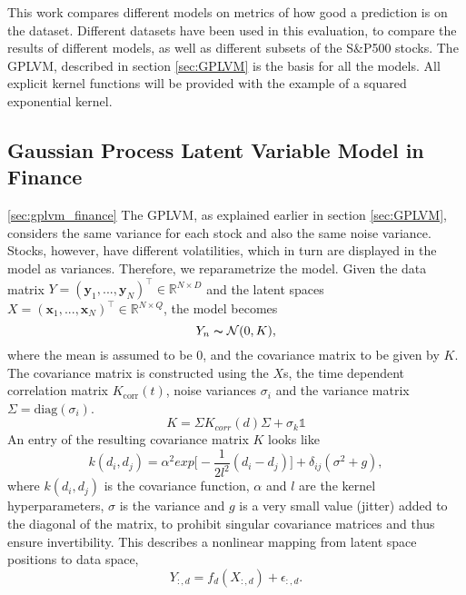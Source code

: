 This work compares different models on metrics of how good a prediction is on the dataset. Different datasets have been used in this evaluation, to compare the results of different models, as well as different subsets of the S\&P500 stocks. The GPLVM, described in section \ref{sec:GPLVM} is the basis for all the models. All explicit kernel functions will be provided with the example of a squared exponential kernel.

\subsection{Gaussian Process Latent Variable Model in Finance}
\ref{sec:gplvm_finance}
The GPLVM, as explained earlier in section \ref{sec:GPLVM}, considers the same variance for each stock and also the same noise variance. Stocks, however, have different volatilities, which in turn are displayed in the model as variances. Therefore, we reparametrize the model. Given the data matrix $Y = (\bm{y}_1, ..., \bm{y}_N)^{\top} \in \mathbb{R}^{N \times D}$ and the latent spaces $X = (\bm{x}_1, ..., \bm{x}_N)^{\top} \in \mathbb{R}^{N \times Q}$, the model becomes 
\begin{equation}%
	Y_n \thicksim \mathcal{N}(0,K),
	\label{eq:financial_model_gplvm}
\end{equation}
where the mean is assumed to be $0$, and the covariance matrix to be given by $K$. The covariance matrix is constructed using the $X$s, the time dependent correlation matrix $K_{\text{corr}}(t)$, noise variances $\sigma_i$ and the variance matrix $\Sigma = \text{diag}(\sigma_i)$. 
\begin{equation}%
	K = \Sigma K_{corr}(d) \Sigma + \sigma_k \mathbb{1}
	\label{eq:constructed_cov_matrix}
\end{equation}
An entry of the resulting covariance matrix $K$ looks like
\begin{equation}%
	k(d_i,d_j) = \alpha^2 exp\Big[-\frac{1}{2l^2}(d_i-d_j)\Big]+ \delta_{ij}(\sigma^2 + g),
	\label{eq:GPLVM_Kx_entry}
\end{equation}
where $k(d_i,d_j)$ is the covariance function, $\alpha$ and $l$ are the kernel hyperparameters, $\sigma$ is the variance and $g$ is a very small value (jitter) added to the diagonal of the matrix, to prohibit singular covariance matrices and thus ensure invertibility. This describes a nonlinear mapping from latent space positions to data space, 
\begin{equation}%
	Y_{:,d} = f_d(X_{:,d}) + \epsilon_{:,d}.
	\label{eq:nonlinear_map}
\end{equation}
